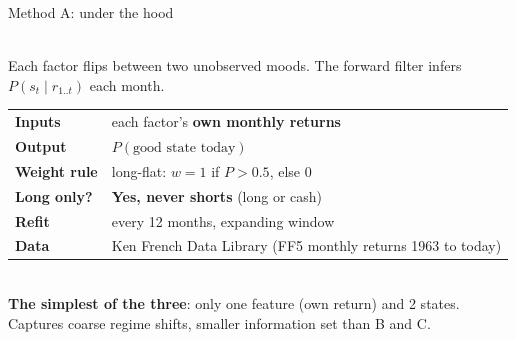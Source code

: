 \documentclass[aspectratio=169, 12pt]{beamer}
\newcommand{\emphp}[1]{{\color{inertiapurple}\textbf{#1}}}
\newcommand{\emphg}[1]{{\color{inertiagreen}\textbf{#1}}}
\begin{document}
\begin{frame}{Method A: under the hood}
  \vspace{4pt}
  \begin{minipage}[t]{0.42\textwidth}
    \vspace{0pt}
    \centering
    \\[6pt]
    {\scriptsize Each factor flips between two unobserved moods. The forward filter infers $P(s_t \mid r_{1..t})$ each month.}
  \end{minipage}\hfill
  \begin{minipage}[t]{0.54\textwidth}
    \vspace{0pt}
    \scriptsize
    \begin{tabular}{@{}p{}p{}@{}}
      \textbf{Inputs} & each factor's \emphp{own monthly returns} \\[2pt]
      \textbf{Output} & $P(\text{good state today})$ \\[2pt]
      \textbf{Weight rule} & long-flat: $w = 1$ if $P > 0.5$, else $0$ \\[2pt]
      \textbf{Long only?} & \emphg{Yes, never shorts} (long or cash) \\[2pt]
      \textbf{Refit} & every 12 months, expanding window \\[2pt]
      \textbf{Data} & Ken French Data Library (FF5 monthly returns 1963 to today) \\
    \end{tabular}\\[6pt]
    {\scriptsize \emphp{The simplest of the three}: only one feature (own return) and 2 states. Captures coarse regime shifts, smaller information set than B and C.}
  \end{minipage}
\end{frame}
\end{document}
